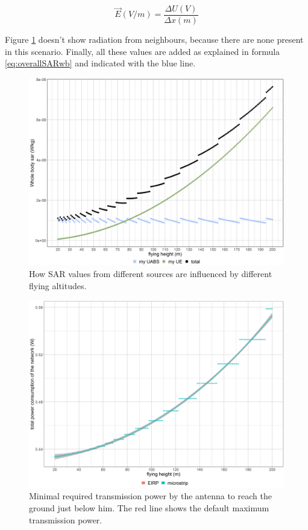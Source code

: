 \begin{equation}
\vec{E} (V/m) = \frac{\Delta U (V) }{\Delta x (m)}
\label{eq:exposureBasicFormula}
\end{equation}


Figure \ref{fig:s1_fhsar} doesn't show radiation from neighbours, because there are none present in this scenario. 
Finally, all these values are added as explained in formula \ref{eq:overallSARwb} and indicated with the blue line. 

\begin{figure}[]
  \includegraphics[width=\textwidth]{../results/s1/fhvssar.png}
  \caption{How SAR values from different sources are influenced by different flying altitudes.}
  \label{fig:s1_fhsar}
\end{figure}

\begin{figure}[t]
  \centering
  \includegraphics[width=\textwidth]{../results/s1/fhvspc.png}
  \caption{Minimal required transmission power by the antenna to reach the ground just below him. The red line shows the default maximum transmission power.}
  \label{fig:ptxfh}
\end{figure}

